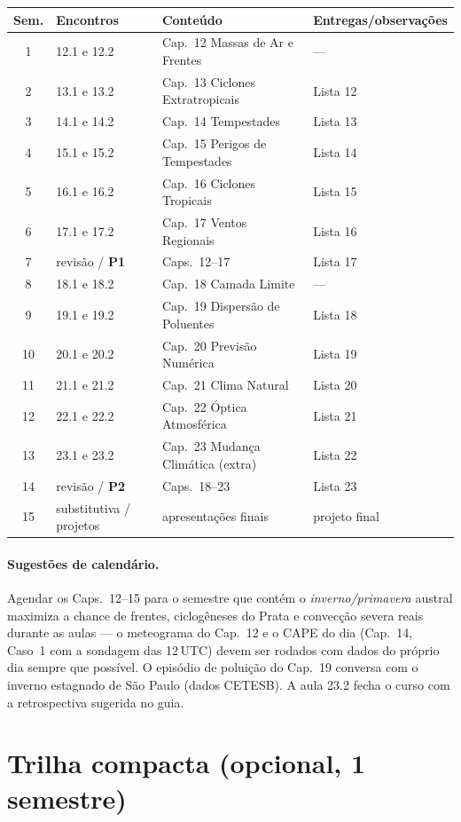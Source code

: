\documentclass[11pt]{article}
\begin{document}
\begin{center}
\begin{tabular}{clll}
\hline
Sem. & Encontros & Conteúdo & Entregas/observações \\
\hline
1 & 12.1 e 12.2 & Cap.~12 Massas de Ar e Frentes & --- \\
2 & 13.1 e 13.2 & Cap.~13 Ciclones Extratropicais & Lista 12 \\
3 & 14.1 e 14.2 & Cap.~14 Tempestades & Lista 13 \\
4 & 15.1 e 15.2 & Cap.~15 Perigos de Tempestades & Lista 14 \\
5 & 16.1 e 16.2 & Cap.~16 Ciclones Tropicais & Lista 15 \\
6 & 17.1 e 17.2 & Cap.~17 Ventos Regionais & Lista 16 \\
7 & revisão / \textbf{P1} & Caps.~12--17 & Lista 17 \\
8 & 18.1 e 18.2 & Cap.~18 Camada Limite & --- \\
9 & 19.1 e 19.2 & Cap.~19 Dispersão de Poluentes & Lista 18 \\
10 & 20.1 e 20.2 & Cap.~20 Previsão Numérica & Lista 19 \\
11 & 21.1 e 21.2 & Cap.~21 Clima Natural & Lista 20 \\
12 & 22.1 e 22.2 & Cap.~22 Óptica Atmosférica & Lista 21 \\
13 & 23.1 e 23.2 & Cap.~23 Mudança Climática (extra) & Lista 22 \\
14 & revisão / \textbf{P2} & Caps.~18--23 & Lista 23 \\
15 & substitutiva / projetos & apresentações finais & projeto final \\
\hline
\end{tabular}
\end{center}

\paragraph{Sugestões de calendário.} Agendar os Caps.~12--15 para o
semestre que contém o \emph{inverno/primavera} austral maximiza a
chance de frentes, ciclogêneses do Prata e convecção severa reais
durante as aulas — o meteograma do Cap.~12 e o CAPE do dia (Cap.~14,
Caso~1 com a sondagem das 12\,UTC) devem ser rodados com dados do
próprio dia sempre que possível. O episódio de poluição do Cap.~19
conversa com o inverno estagnado de São Paulo (dados CETESB). A aula
23.2 fecha o curso com a retrospectiva sugerida no guia.

\section*{Trilha compacta (opcional, 1 semestre)}
\end{document}
